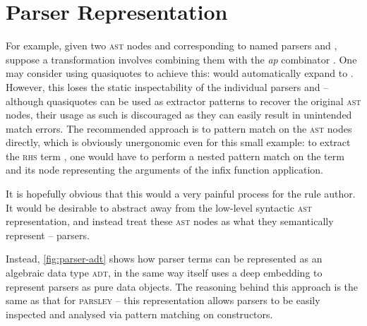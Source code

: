\documentclass[../../main.tex]{subfiles}
\begin{document}
\section{Parser Representation}\label{sec:parser-representation}


For example, given two \textsc{ast} nodes  and  corresponding to named parsers  and , suppose a transformation involves combining them with the \emph{ap} combinator \scala{<*>}.
One may consider using quasiquotes to achieve this:  would automatically expand to .
However, this loses the static inspectability of the individual parsers  and  -- although quasiquotes can be used as extractor patterns to recover the original \textsc{ast} nodes, their usage as such is discouraged as they can easily result in unintended match errors. %
The recommended approach is to pattern match on the \textsc{ast} nodes directly, which is obviously unergonomic even for this small example: to extract the \textsc{rhs} term , one would have to perform a nested pattern match on the  term and its  node representing the arguments of the infix function application.

It is hopefully obvious that this would a very painful process for the rule author.
It would be desirable to abstract away from the low-level syntactic \textsc{ast} representation, and instead treat these \textsc{ast} nodes as what they semantically represent -- parsers.

Instead, \cref{fig:parser-adt} shows how parser terms can be represented as an algebraic data type \textsc{adt}, in the same way  itself uses a deep embedding to represent parsers as pure data objects.
The reasoning behind this approach is the same as that for \textsc{parsley} -- this representation allows parsers to be easily inspected and analysed via pattern matching on constructors.
\end{document}
